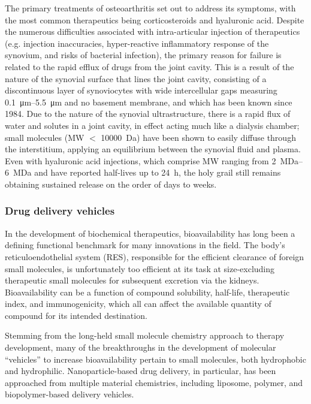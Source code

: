 \begin{refsection}
The primary treatments of osteoarthritis set out to address its symptoms, with
the most common therapeutics being corticosteroids and hyaluronic
acid.\cite{Butoescu2009} Despite the numerous difficulties associated with
intra-articular injection of therapeutics (e.g. injection inaccuracies,
hyper-reactive inflammatory response of the synovium, and risks of bacterial
infection), the primary reason for failure is related to the rapid efflux of
drugs from the joint cavity.\cite{Ayral2001} This is a result of the
nature of the synovial surface that lines the joint cavity, consisting of a
discontinuous layer of synoviocytes with wide intercellular gaps measuring
\SIrange{0.1}{5.5}{\um} and no basement membrane, and which has been known since
1984.\cite{Knight1984} Due to the nature of the synovial ultrastructure, there
is a rapid flux of water and solutes in a joint cavity, in effect acting 
much like a dialysis chamber; small molecules (MW ${<}$ \SI{10000}{\dalton}) have
been shown to easily diffuse through the interstitium, applying an equilibrium
between the synovial fluid and plasma.\cite{Gerwin2006,Okuyama1984} Even with
hyaluronic acid injections, which comprise MW ranging from
\SIrange{2}{6}{\mega\dalton} and have reported half-lives up to \SI{24}{\hour},
the holy grail still remains obtaining sustained release on the order of days to
weeks.

\subsubsection{Drug delivery vehicles}

In the development of biochemical therapeutics, bioavailability has long been a
defining functional benchmark for many innovations in the field. The body's
reticuloendothelial system (RES), responsible for the efficient clearance of foreign
small molecules, is unfortunately too efficient at its task at size-excluding
therapeutic small molecules for subsequent excretion via the kidneys.
Bioavailability can be a function of compound solubility, 
half-life, therapeutic index, and immunogenicity, which all can affect the
available quantity of compound for its intended
destination.\cite{Petros2010,Davis2008,Shah1992}

Stemming from the long-held small molecule chemistry approach to therapy development,
many of the breakthroughs in the development of molecular ``vehicles'' to
increase bioavailability pertain to small molecules, both hydrophobic and
hydrophilic.\cite{Branco2009} Nanoparticle-based drug delivery, in particular, has been
approached from multiple material chemistries, including liposome, polymer, and
biopolymer-based delivery
vehicles.\cite{Branco2009,Iyer2006,Park2010,McDaniel2010}


\end{refsection}
